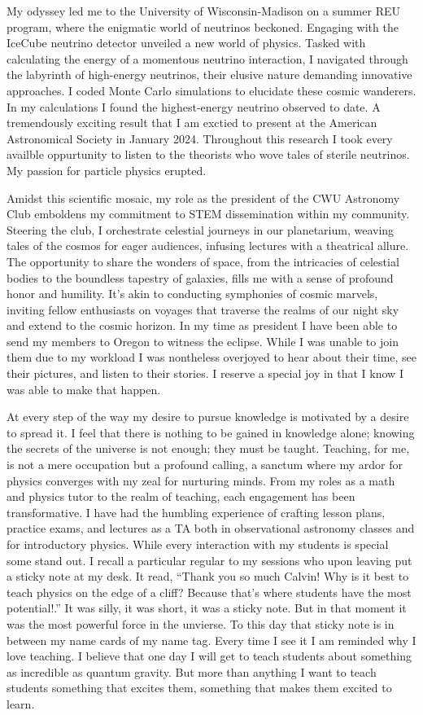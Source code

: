 \documentclass[a4paper, 12pt]{../../config/homework}
\begin{document}
My odyssey led me to the University of Wisconsin-Madison on a summer REU program, where the enigmatic world of neutrinos beckoned. Engaging with the IceCube neutrino detector unveiled a new world of physics. Tasked with calculating the energy of a momentous neutrino interaction, I navigated through the labyrinth of high-energy neutrinos, their elusive nature demanding innovative approaches. I coded Monte Carlo simulations to elucidate these cosmic wanderers. In my calculations I found the highest-energy neutrino observed to date. A tremendously exciting result that I am exctied to present at the American Astronomical Society in January 2024. Throughout this research I took every availble oppurtunity to listen to the theorists who wove tales of sterile neutrinos. My passion for particle physics erupted.

Amidst this scientific mosaic, my role as the president of the CWU Astronomy Club emboldens my commitment to STEM dissemination within my community. Steering the club, I orchestrate celestial journeys in our planetarium, weaving tales of the cosmos for eager audiences, infusing lectures with a theatrical allure. The opportunity to share the wonders of space, from the intricacies of celestial bodies to the boundless tapestry of galaxies, fills me with a sense of profound honor and humility. It's akin to conducting symphonies of cosmic marvels, inviting fellow enthusiasts on voyages that traverse the realms of our night sky and extend to the cosmic horizon. In my time as president I have been able to send my members to Oregon to witness the eclipse. While I was unable to join them due to my workload I was nontheless overjoyed to hear about their time, see their pictures, and listen to their stories. I reserve a special joy in that I know I was able to make that happen.

At every step of the way my desire to pursue knowledge is motivated by a desire to spread it. I feel that there is nothing to be gained in knowledge alone; knowing the secrets of the universe is not enough; they must be taught. Teaching, for me, is not a mere occupation but a profound calling, a sanctum where my ardor for physics converges with my zeal for nurturing minds. From my roles as a math and physics tutor to the realm of teaching, each engagement has been transformative. I have had the humbling experience of crafting lesson plans, practice exams, and lectures as a TA both in observational astronomy classes and for introductory physics. While every interaction with my students is special some stand out. I recall a particular regular to my sessions who upon leaving put a sticky note at my desk. It read, “Thank you so much Calvin! Why is it best to teach physics on the edge of a cliff? Because that’s where students have the most potential!.” It was silly, it was short, it was a sticky note. But in that moment it was the most powerful force in the unvierse. To this day that sticky note is in between my name cards of my name tag. Every time I see it I am reminded why I love teaching. I believe that one day I will get to teach students about something as incredible as quantum gravity. But more than anything I want to teach students something that excites them, something that makes them excited to learn.
\end{document}
